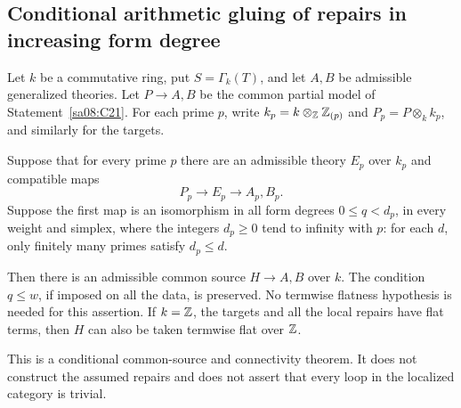 \subsection{Conditional arithmetic gluing of repairs in increasing form degree}

\begin{theorem}
\label{sa08:C30}
Let $k$ be a commutative ring, put $S=\Gamma_k(T)$, and let
$A,B$ be admissible generalized theories. Let $P\to A,B$ be
the common partial model of Statement~\ref{sa08:C21}.
For each prime $p$, write $k_p=k\otimes_\mathbb Z\mathbb Z_{(p)}$ and
$P_p=P\otimes_k k_p$, and similarly for the targets.

Suppose that for every prime $p$ there are an admissible
theory $E_p$ over $k_p$ and compatible maps
\[
 P_p\longrightarrow E_p\longrightarrow A_p,B_p.
\]
Suppose the first map is an isomorphism in all form degrees
$0\leq q<d_p$, in every weight and simplex, where the integers
$d_p\geq0$ tend to infinity with $p$: for each $d$, only
finitely many primes satisfy $d_p\leq d$.

Then there is an admissible common source $H\to A,B$ over
$k$. The condition $q\leq w$, if imposed on all the data,
is preserved. No termwise flatness hypothesis is needed
for this assertion. If $k=\mathbb Z$, the targets and all the
local repairs have flat terms, then $H$ can also be taken
termwise flat over $\mathbb Z$.

This is a conditional common-source and connectivity
theorem. It does not construct the assumed repairs and
does not assert that every loop in the localized category
is trivial.
\end{theorem}
